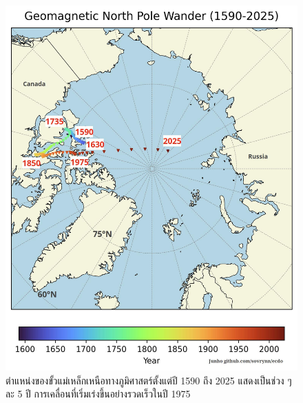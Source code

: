 \documentclass[10pt,twocolumn,letterpaper]{article}
\begin{document}
\begin{figure}[t]
\begin{center}
   \includegraphics[width=1\linewidth]{npw.jpg}
\end{center}
   \caption{ตำแหน่งของขั้วแม่เหล็กเหนือทางภูมิศาสตร์ตั้งแต่ปี 1590 ถึง 2025 แสดงเป็นช่วง ๆ ละ 5 ปี \cite{41} การเคลื่อนที่เริ่มเร่งขึ้นอย่างรวดเร็วในปี 1975}
\label{fig:13}
\label{fig:onecol}
\end{figure}
\end{document}
